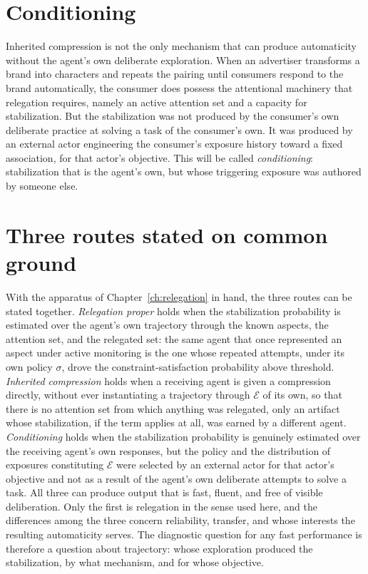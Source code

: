 \documentclass[11pt]{report}
\theoremstyle{remark}
\theoremstyle{definition}
\begin{document}
\section{Conditioning}

Inherited compression is not the only mechanism that can produce automaticity without the agent's own deliberate exploration. When an advertiser transforms a brand into characters and repeats the pairing until consumers respond to the brand automatically, the consumer does possess the attentional machinery that relegation requires, namely an active attention set and a capacity for stabilization. But the stabilization was not produced by the consumer's own deliberate practice at solving a task of the consumer's own. It was produced by an external actor engineering the consumer's exposure history toward a fixed association, for that actor's objective. This will be called \emph{conditioning}: stabilization that is the agent's own, but whose triggering exposure was authored by someone else.

\section{Three routes stated on common ground}

With the apparatus of Chapter~\ref{ch:relegation} in hand, the three routes can be stated together. \emph{Relegation proper} holds when the stabilization probability is estimated over the agent's own trajectory through the known aspects, the attention set, and the relegated set: the same agent that once represented an aspect under active monitoring is the one whose repeated attempts, under its own policy $\sigma$, drove the constraint-satisfaction probability above threshold. \emph{Inherited compression} holds when a receiving agent is given a compression directly, without ever instantiating a trajectory through $\mathcal{E}$ of its own, so that there is no attention set from which anything was relegated, only an artifact whose stabilization, if the term applies at all, was earned by a different agent. \emph{Conditioning} holds when the stabilization probability is genuinely estimated over the receiving agent's own responses, but the policy and the distribution of exposures constituting $\mathcal{E}$ were selected by an external actor for that actor's objective and not as a result of the agent's own deliberate attempts to solve a task. All three can produce output that is fast, fluent, and free of visible deliberation. Only the first is relegation in the sense used here, and the differences among the three concern reliability, transfer, and whose interests the resulting automaticity serves. The diagnostic question for any fast performance is therefore a question about trajectory: whose exploration produced the stabilization, by what mechanism, and for whose objective.
\end{document}
